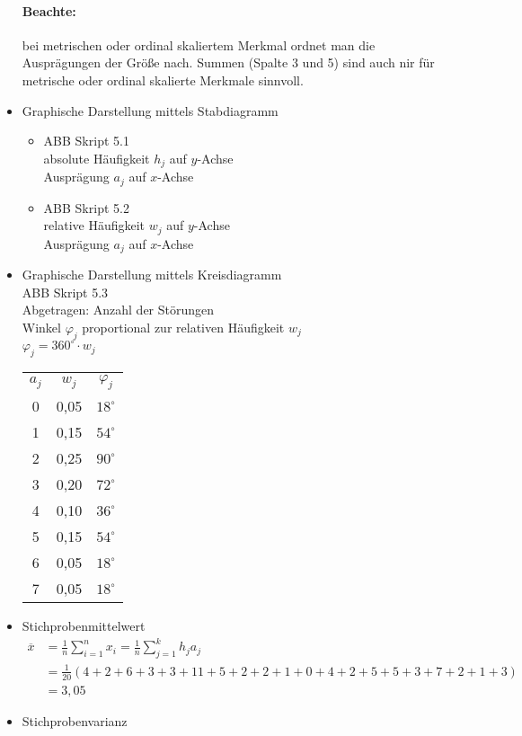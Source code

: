 \begin{itemize}
\paragraph{Beachte:} bei metrischen oder ordinal skaliertem Merkmal ordnet man die Ausprägungen der Größe nach. Summen (Spalte 3 und 5) sind auch nir für metrische oder ordinal skalierte Merkmale sinnvoll.
\item Graphische Darstellung mittels Stabdiagramm
\begin{itemize}
\item ABB Skript 5.1\\
absolute Häufigkeit $h_j$ auf $y$-Achse\\
Ausprägung $a_j$ auf $x$-Achse
\item ABB Skript 5.2\\
relative Häufigkeit $w_j$ auf $y$-Achse\\
Ausprägung $a_j$ auf $x$-Achse
\end{itemize}
\item Graphische Darstellung mittels Kreisdiagramm\\
ABB Skript 5.3\\
Abgetragen: Anzahl der Störungen\\
Winkel $\varphi_j$ proportional zur relativen Häufigkeit $w_j$\\
$\varphi_j = 360^\circ \cdot w_j$\\
\begin{tabular}{c c c}
$a_j$ & $w_j$ & $\varphi_j$\\
0 & 0,05 & $18^\circ$\\
1 & 0,15 & $54^\circ$\\
2 & 0,25 & $90^\circ$\\
3 & 0,20 & $72^\circ$\\
4 & 0,10 & $36^\circ$\\
5 & 0,15 & $54^\circ$\\
6 & 0,05 & $18^\circ$\\
7 & 0,05 & $18^\circ$
\end{tabular}
\item Stichprobenmittelwert
\begin{align*}
\overline{x} &= \frac{1}{n} \sum_{i=1}^n x_i = \frac{1}{n} \sum_{j=1}^k h_j a_j\\
&= \frac{1}{20}(4+2+6+3+3+11+5+2+2+1+0+4+2+5+5+3+7+2+1+3)\\
&= 3,05
\end{align*}
\item Stichprobenvarianz
\begin{align*}

\end{align*}
\end{itemize}
